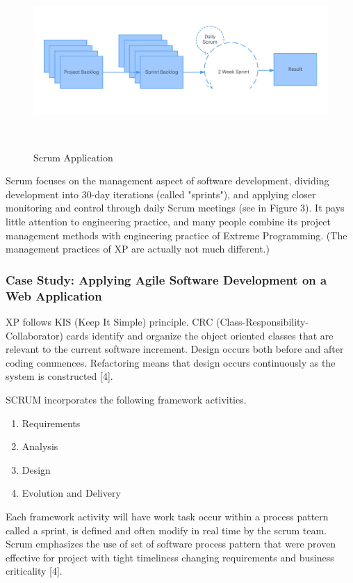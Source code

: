 \documentclass{sigchi}
\begin{document}
\begin{figure}
\centering
  \includegraphics[width=0.9\columnwidth]{figures/scrum}
  \caption{Scrum Application }~\label{fig:figure1}
\end{figure}

Scrum focuses on the management aspect of software development, dividing development into 30-day iterations (called "sprints"), and applying closer monitoring and control through daily Scrum meetings (see in Figure 3). It pays little attention to engineering practice, and many people combine its project management methods with engineering practice of Extreme Programming. (The management practices of XP are actually not much different.)

\subsubsection{Case Study: Applying Agile Software Development on a Web Application}


XP follows KIS (Keep It Simple) principle. CRC
(Class-Responsibility- Collaborator) cards identify and
organize the object oriented classes that are relevant to
the current software increment. Design occurs both
before and after coding commences. Refactoring
means that design occurs continuously as the system is
constructed [4].

SCRUM incorporates the following framework activities.
\begin{itemize}
\begin{enumerate}
\item Requirements
\item Analysis
\item Design
\item Evolution and Delivery
\end{enumerate}

\end{itemize}
Each framework activity will have work task
occur within a process pattern called a sprint, is defined and often modify in real time by the scrum team. Scrum emphasizes the use of set of software process pattern that were proven effective for project with tight timeliness changing requirements and business criticality [4].
\end{document}
